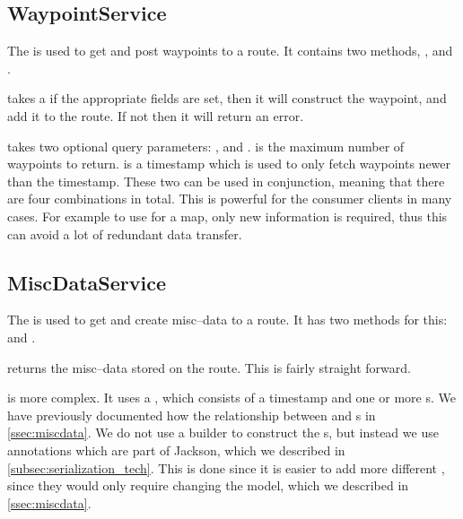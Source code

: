 \subsection{WaypointService}\label{subsec:waypointservice}
The  is used to get and post waypoints to a route.
It contains two methods, , and .

 takes a  if the appropriate fields are set, then it will construct the waypoint, and add it to the route.
If not then it will return an error.

 takes two optional query parameters: , and .
 is the maximum number of waypoints to return.
 is a timestamp which is used to only fetch waypoints newer than the timestamp.
These two can be used in conjunction, meaning that there are four combinations in total.
This is powerful for the consumer clients in many cases.
For example to use for a map, only new information is required, thus this can avoid a lot of redundant data transfer.

\subsection{MiscDataService}\label{subsec:miscdataservice}
The  is used to get and create misc--data to a route.
It has two methods for this:  and .

 returns the misc--data stored on the route.
This is fairly straight forward.

 is more complex.
It uses a , which consists of a timestamp and one or more s.
We have previously documented how the relationship between  and s in \cref{ssec:miscdata}.
We do not use a builder to construct the s, but instead we use annotations which are part of Jackson, which we described in \cref{subsec:serialization_tech}.
This is done since it is easier to add more different , since they would only require changing the model, which we described in \cref{ssec:miscdata}.
